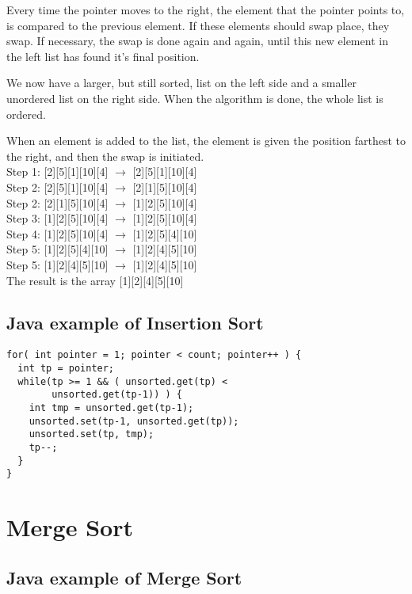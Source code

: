 \documentclass[12pt,a4paper]{article}
\begin{document}
Every time the pointer moves to the right, the element that the pointer points to, is compared to the previous element. If these elements should swap place, they swap. If necessary, the swap is done again and again, until this new element in the left list has found it's final position. 

We now have a larger, but still sorted, list on the left side and a smaller unordered list on the right side. When the algorithm is done, the whole list is ordered.

When an element is added to the list, the element is given the position farthest to the right, and then the swap is initiated.\\

\noindent
Step 1: {\color{blue}[2][5]}[1][10][4] $\rightarrow$ {\color{blue}[2][5]}[1][10][4]\\
\noindent
Step 2: [2]{\color{blue}[5][1]}[10][4] $\rightarrow$ [2]{\color{blue}[1][5]}[10][4]\\
\noindent
Step 2: {\color{blue}[2][1]}[5][10][4] $\rightarrow$ {\color{blue}[1][2]}[5][10][4]\\
\noindent
Step 3: [1][2]{\color{blue}[5][10]}[4] $\rightarrow$ [1][2]{\color{blue}[5][10]}[4]\\
\noindent
Step 4: [1][2][5]{\color{blue}[10][4]} $\rightarrow$ [1][2][5]{\color{blue}[4][10]}\\
\noindent
Step 5: [1][2]{\color{blue}[5][4]}[10] $\rightarrow$ [1][2]{\color{blue}[4][5]}[10]\\
\noindent
Step 5: [1]{\color{blue}[2][4]}[5][10] $\rightarrow$ [1]{\color{blue}[2][4]}[5][10]\\

\noindent
The result is the array [1][2][4][5][10]

\subsection{Java example of Insertion Sort}
\begin{lstlisting}
for( int pointer = 1; pointer < count; pointer++ ) {
  int tp = pointer;
  while(tp >= 1 && ( unsorted.get(tp) < 
        unsorted.get(tp-1)) ) {
    int tmp = unsorted.get(tp-1);
    unsorted.set(tp-1, unsorted.get(tp));
    unsorted.set(tp, tmp);
    tp--;
  }
}
\end{lstlisting}
\section{Merge Sort}

\subsection{Java example of Merge Sort}
\end{document}
